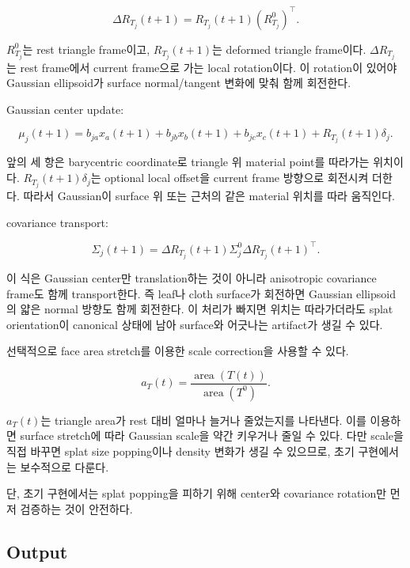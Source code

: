 \documentclass[11pt,a4paper]{article}
\begin{document}
\begin{equation}
\Delta R_{T_j}(t+1)=R_{T_j}(t+1)(R_{T_j}^{0})^\top.
\end{equation}

$R_{T_j}^0$는 rest triangle frame이고, $R_{T_j}(t+1)$는 deformed triangle frame이다.
$\Delta R_{T_j}$는 rest frame에서 current frame으로 가는 local rotation이다.
이 rotation이 있어야 Gaussian ellipsoid가 surface normal/tangent 변화에 맞춰 함께 회전한다.

Gaussian center update:

\begin{equation}
\mu_j(t+1)=b_{ja}x_a(t+1)+b_{jb}x_b(t+1)+b_{jc}x_c(t+1)+R_{T_j}(t+1)\delta_j.
\end{equation}

앞의 세 항은 barycentric coordinate로 triangle 위 material point를 따라가는 위치이다.
$R_{T_j}(t+1)\delta_j$는 optional local offset을 current frame 방향으로 회전시켜 더한다.
따라서 Gaussian이 surface 위 또는 근처의 같은 material 위치를 따라 움직인다.

covariance transport:

\begin{equation}
\Sigma_j(t+1)=\Delta R_{T_j}(t+1)\Sigma_j^0\Delta R_{T_j}(t+1)^\top.
\end{equation}

이 식은 Gaussian center만 translation하는 것이 아니라 anisotropic covariance frame도 함께 transport한다.
즉 leaf나 cloth surface가 회전하면 Gaussian ellipsoid의 얇은 normal 방향도 함께 회전한다.
이 처리가 빠지면 위치는 따라가더라도 splat orientation이 canonical 상태에 남아 surface와 어긋나는 artifact가 생길 수 있다.

선택적으로 face area stretch를 이용한 scale correction을 사용할 수 있다.

\begin{equation}
a_T(t)=\frac{\operatorname{area}(T(t))}{\operatorname{area}(T^0)}.
\end{equation}

$a_T(t)$는 triangle area가 rest 대비 얼마나 늘거나 줄었는지를 나타낸다.
이를 이용하면 surface stretch에 따라 Gaussian scale을 약간 키우거나 줄일 수 있다.
다만 scale을 직접 바꾸면 splat size popping이나 density 변화가 생길 수 있으므로, 초기 구현에서는 보수적으로 다룬다.

단, 초기 구현에서는 splat popping을 피하기 위해 center와 covariance rotation만 먼저 검증하는 것이 안전하다.

\subsection*{Output}
\end{document}
